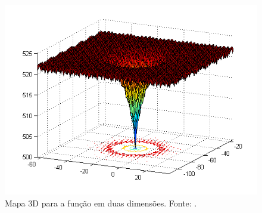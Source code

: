 \begin{figure}[!ht]%
    \centering
    \includegraphics[scale=0.5]{img/f5.png}
    \caption{Mapa 3D para a função  em duas dimensões. Fonte: .}%
    \label{fig:f5}
\end{figure}


